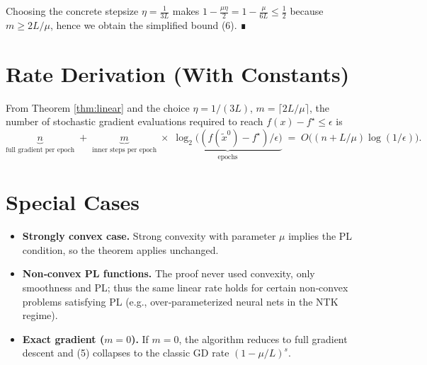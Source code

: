 \documentclass{article}
\begin{document}
Choosing the concrete stepsize $\eta=\frac{1}{3L}$ makes
$1-\frac{\mu\eta}{2}=1-\frac{\mu}{6L}\le \frac12$ because $m\ge 2L/\mu$,
hence we obtain the simplified bound (6).  ∎

\section*{Rate Derivation (With Constants)}
From Theorem \ref{thm:linear} and the choice $\eta=1/(3L)$, $m=\lceil 2L/\mu\rceil$,
the number of stochastic gradient evaluations required to reach
$f(x)-f^{\star}\le\epsilon$ is
\[
\underbrace{n}_{\text{full gradient per epoch}}
\;+\;
\underbrace{m}_{\text{inner steps per epoch}}
\;\times\;
\underbrace{\log_{2}\!\bigl((f(\tilde{x}^{0})-f^{\star})/\epsilon\bigr)}_{\text{epochs}}
\;=\;
O\!\bigl((n+L/\mu)\log(1/\epsilon)\bigr).
\]

\section*{Special Cases}
\begin{itemize}
\item \textbf{Strongly convex case.} Strong convexity with parameter $\mu$ implies the PL condition, so the theorem applies unchanged.
\item \textbf{Non‑convex PL functions.} The proof never used convexity, only smoothness and PL; thus the same linear rate holds for certain non‑convex problems satisfying PL (e.g., over‑parameterized neural nets in the NTK regime).
\item \textbf{Exact gradient ($m=0$).} If $m=0$, the algorithm reduces to full gradient descent and (5) collapses to the classic GD rate $(1-\mu/L)^{s}$.
\end{itemize}
\end{document}
